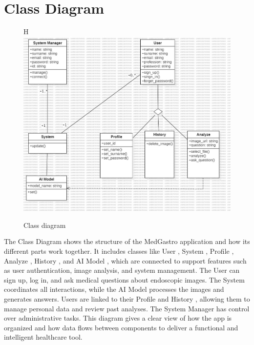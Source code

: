 \documentclass[12pt,a4paper]{report}
\begin{document}
\section{Class Diagram}
\begin{figure}{H}
    \centering
    \includegraphics[width=1\linewidth]{ClassDiagram1.jpg}
    \caption{Class diagram}
    \label{fig:enter-label}
\end{figure}

The Class Diagram shows the structure of the MedGastro application and how its different parts work together. It includes classes like User , System , Profile , Analyze , History , and AI Model , which are connected to support features such as user authentication, image analysis, and system management. The User can sign up, log in, and ask medical questions about endoscopic images. The System coordinates all interactions, while the AI Model processes the images and generates answers. Users are linked to their Profile and History , allowing them to manage personal data and review past analyses. The System Manager has control over administrative tasks. This diagram gives a clear view of how the app is organized and how data flows between components to deliver a functional and intelligent healthcare tool. 
\end{document}
